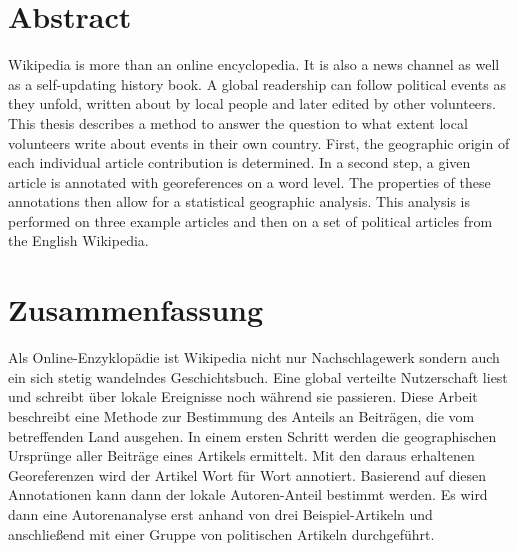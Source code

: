 \begingroup
\let\clearpage\relax
\let\cleardoublepage\relax
\let\cleardoublepage\relax

\chapter*{Abstract}

Wikipedia is more than an online encyclopedia. 
It is also a news channel as well as a self-updating history book.
A global readership can follow political events as they unfold, written about by local people and later edited by other volunteers.
This thesis describes a method to answer the question to what extent local volunteers write about events in their own country.
First, the geographic origin of each individual article contribution is determined.
In a second step, a given article is annotated with georeferences on a word level.
The properties of these annotations then allow for a statistical geographic analysis.
This analysis is performed on three example articles and then on a set of political articles from the English Wikipedia.

\vfill

\chapter*{Zusammenfassung}

Als Online-Enzyklopädie ist Wikipedia nicht nur Nachschlagewerk sondern auch ein sich stetig wandelndes Geschichtsbuch. 
Eine global verteilte Nutzerschaft liest und schreibt über lokale Ereignisse noch während sie passieren. 
Diese Arbeit beschreibt eine Methode zur Bestimmung des Anteils an Beitr\"agen, die vom betreffenden Land ausgehen.
In einem ersten Schritt werden die geographischen Urspr\"unge aller Beitr\"age eines Artikels ermittelt.
Mit den daraus erhaltenen Georeferenzen wird der Artikel Wort f\"ur Wort annotiert.
Basierend auf diesen Annotationen kann dann der lokale Autoren-Anteil bestimmt werden.
Es wird dann eine Autorenanalyse erst anhand von drei Beispiel-Artikeln und anschlie{\ss}end mit einer Gruppe von politischen Artikeln durchgef\"uhrt.

\endgroup			

\vfill